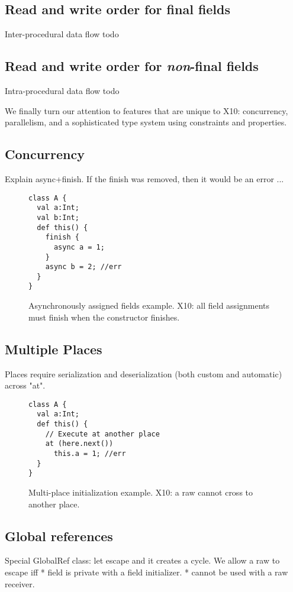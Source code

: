\subsection{Read and write order for final fields}
Inter-procedural data flow
todo


\subsection{Read and write order for \emph{non}-final fields}
Intra-procedural data flow
todo




We finally turn our attention to features that are unique to X10:
    concurrency, parallelism,
    and a sophisticated type system using constraints and properties.

\subsection{Concurrency}
Explain async+finish.
If the finish was removed, then it would be an error ...

\begin{figure}
\begin{lstlisting}
class A {
  val a:Int;
  val b:Int;
  def this() {
    finish {
      async a = 1;
    }
    async b = 2; //err
  }
}
\end{lstlisting}
\caption{Asynchronously assigned fields example.
    X10: all field assignments must finish when the constructor finishes.}
\label{Figure:Asynchronously-init}
\end{figure}


\subsection{Multiple Places}
Places require serialization and deserialization (both custom and automatic) across "at".

\begin{figure}
\begin{lstlisting}
class A {
  val a:Int;
  def this() {
    // Execute at another place
    at (here.next())
      this.a = 1; //err
  }
}
\end{lstlisting}
\caption{Multi-place initialization example.
    X10: a raw \this cannot cross to another place.}
\label{Figure:Multi-place}
\end{figure}


\subsection{Global references}
Special GlobalRef class: let \this escape and it creates a cycle.
We allow a raw \this to escape iff
* field is private with a field initializer.
* cannot be used with a raw \this receiver.

